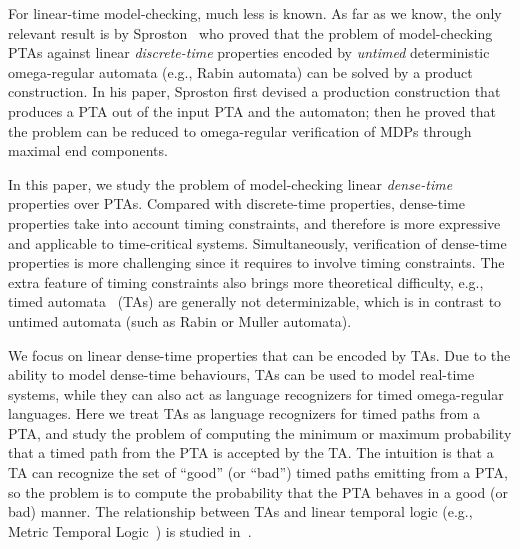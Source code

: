 For linear-time model-checking, much less is known.
As far as we know, the only relevant result is by Sproston~\cite{DBLP:conf/qest/Sproston11} who proved that the problem of model-checking PTAs against linear \emph{discrete-time} properties encoded by \emph{untimed} deterministic omega-regular automata (e.g., Rabin automata) can be solved by a product construction.
In his paper, Sproston first devised a production construction that produces a PTA out of the input PTA and the automaton;
then he proved that the problem can be reduced to omega-regular verification of MDPs through maximal end components.

In this paper, we study the problem of model-checking linear \emph{dense-time} properties over PTAs.
Compared with discrete-time properties, dense-time properties take into account timing constraints, and therefore is more expressive and applicable to time-critical systems.
Simultaneously, verification of dense-time properties is more challenging since it requires to involve timing constraints.
The extra feature of timing constraints also brings more theoretical difficulty, e.g.,
timed automata~\cite{DBLP:journals/tcs/AlurD94} (TAs) are generally not determinizable,
which is in contrast to untimed automata (such as Rabin or Muller automata).

We focus on linear dense-time properties that can be encoded by TAs.
Due to the ability to model dense-time behaviours,
TAs can be used to model real-time systems, while they can also act as language recognizers for timed omega-regular languages.
Here we treat TAs as language recognizers for timed paths from a PTA, and study
the problem of computing the minimum or maximum probability that a timed path from the PTA is accepted by the TA.
The intuition is that a TA can recognize the set of ``good'' (or ``bad'') timed paths emitting from a PTA,
so the problem is to compute the probability that the PTA behaves in a good (or bad) manner.
The relationship between TAs and linear temporal logic (e.g., Metric Temporal Logic~\cite{DBLP:journals/rts/Koymans90}) is studied in~\cite{DBLP:conf/lics/OuaknineW05,DBLP:journals/jacm/AlurFH96}.

